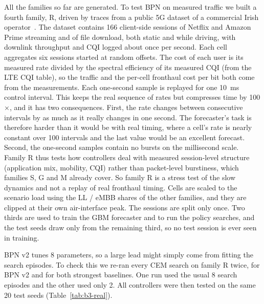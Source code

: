 All the families so far are generated. To test BPN on measured traffic we built a fourth family, R, driven by traces from a public 5G dataset of a commercial Irish operator~\cite{raca2020beyond}. The dataset contains 166 client-side sessions of Netflix and Amazon Prime streaming and of file download, both static and while driving, with downlink throughput and CQI logged about once per second. Each cell aggregates six sessions started at random offsets. The cost of each user is its measured rate divided by the spectral efficiency of its measured CQI (from the LTE CQI table), so the traffic and the per-cell fronthaul cost per bit both come from the measurements. Each one-second sample is replayed for one 10~ms control interval. This keeps the real sequence of rates but compresses time by 100$\times$, and it has two consequences. First, the rate changes between consecutive intervals by as much as it really changes in one second. The forecaster's task is therefore harder than it would be with real timing, where a cell's rate is nearly constant over 100 intervals and the last value would be an excellent forecast. Second, the one-second samples contain no bursts on the millisecond scale. Family R thus tests how controllers deal with measured session-level structure (application mix, mobility, CQI) rather than packet-level burstiness, which families S, G and M already cover. So family R is a stress test of the slow dynamics and not a replay of real fronthaul timing. Cells are scaled to the scenario load using the LL / eMBB shares of the other families, and they are clipped at their own air-interface peak. The sessions are split only once. Two thirds are used to train the GBM forecaster and to run the policy searches, and the test seeds draw only from the remaining third, so no test session is ever seen in training.

BPN v2 tunes 8 parameters, so a large lead might simply come from fitting the search episodes. To check this we re-ran every CEM search on family R twice, for BPN v2 and for both strongest baselines. One run used the usual 8 search episodes and the other used only 2. All controllers were then tested on the same 20 test seeds (Table~\ref{tab:b3-real}).

